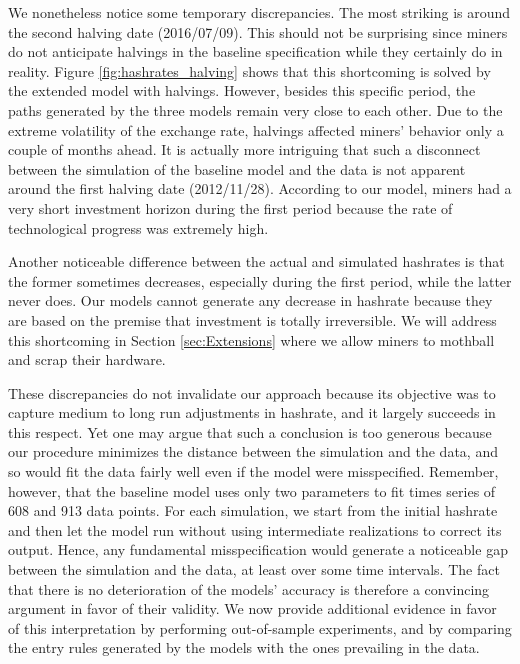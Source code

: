 \documentclass[12pt, a4paper]{article}
\begin{document}
We nonetheless notice some temporary discrepancies. The most striking is around the second
halving date (2016/07/09).
This should not be surprising since miners do not
anticipate halvings in the baseline specification while they certainly do in reality.
Figure \ref{fig:hashrates_halving} shows that this shortcoming is solved by the extended model
with halvings.
However, besides this specific period, the paths generated by the three models
remain very close to each other. Due to the extreme volatility of the exchange rate,
halvings affected miners' behavior only a couple of months ahead. It is actually more intriguing that such a disconnect between the simulation
of the baseline model and the data is not apparent around the first halving date (2012/11/28). According to our model,
miners had a very short investment horizon during the first period because the rate of technological progress was extremely high.

Another noticeable difference between the actual and simulated hashrates
is that the former sometimes decreases, especially during the first period,
while the latter never does. Our models cannot generate any decrease in
hashrate because they are based on the premise that investment is totally
irreversible. We will address this shortcoming in Section \ref{sec:Extensions}
where we allow miners to mothball and scrap their
hardware.


These discrepancies do not invalidate our approach because its objective
was to capture medium to long run adjustments in hashrate, and it
largely succeeds in this respect. Yet one may argue that
such a conclusion is too generous because our procedure minimizes the
distance between the simulation and the data, and so would fit the data
fairly well even if the model were misspecified. Remember, however,
that the baseline model uses only two parameters to
fit times series of 608 and 913 data points. For each
simulation, we start from the initial hashrate and then
let the model run without using intermediate realizations to correct its
output. Hence, any fundamental
misspecification would generate a noticeable gap between the
simulation and the data, at least over some time intervals. The fact that
there is no deterioration of the models' accuracy is therefore a
convincing argument in favor of their validity. We now provide additional evidence in favor of this
interpretation by performing out-of-sample experiments, and by comparing the entry
rules generated by the models with the ones prevailing in the data.
\end{document}

